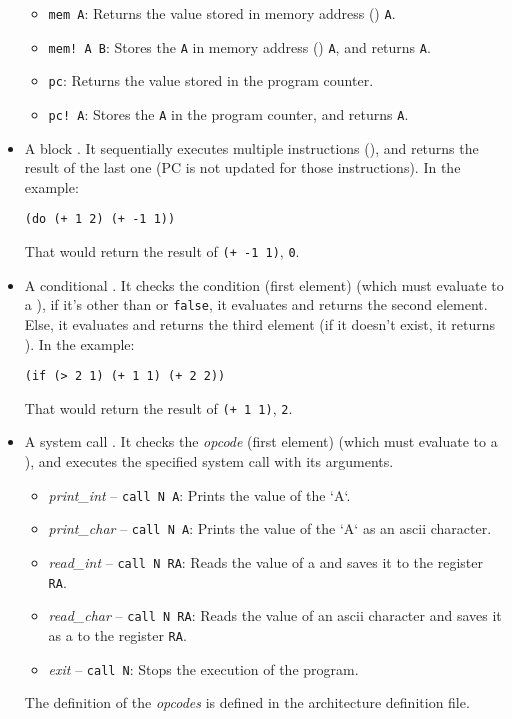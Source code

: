 \begin{itemize}
\begin{itemize}
    \item \texttt{mem A}: Returns the value stored in memory address () \texttt{A}.
    \item \texttt{mem!\ A B}: Stores the  \texttt{A} in memory address () \texttt{A}, and returns \texttt{A}.
    \item \texttt{pc}: Returns the value stored in the program counter.
    \item \texttt{pc!\ A}: Stores the  \texttt{A} in the program counter, and returns \texttt{A}.
  \end{itemize}
  \item A block . It sequentially executes multiple instructions (), and returns the result of the last one (PC is not updated for those instructions). In the example:
  \begin{lstlisting}
(do (+ 1 2) (+ -1 1))
  \end{lstlisting}
  That would return the result of \texttt{(+ -1 1)}, \texttt{0}.
  \item A conditional . It checks the condition (first element) (which must evaluate to a ), if it's other than  or \texttt{false}, it evaluates and returns the second element. Else, it evaluates and returns the third element (if it doesn't exist, it returns ). In the example:
  \begin{lstlisting}
(if (> 2 1) (+ 1 1) (+ 2 2))
  \end{lstlisting}
  That would return the result of \texttt{(+ 1 1)}, \texttt{2}.
  \item A system call . It checks the \textit{opcode} (first element) (which must evaluate to a ), and executes the specified system call with its arguments.
  \begin{itemize}
    \item \textit{print\_int} -- \texttt{call N A}: Prints the value of the  `A`.
    \item \textit{print\_char} -- \texttt{call N A}: Prints the value of the  `A` as an ascii character.
    \item \textit{read\_int} -- \texttt{call N RA}: Reads the value of a  and saves it to the register \texttt{RA}.
    \item \textit{read\_char} -- \texttt{call N RA}: Reads the value of an ascii character and saves it as a  to the register \texttt{RA}.
    \item \textit{exit} -- \texttt{call N}: Stops the execution of the program.
  \end{itemize}
  The definition of the \textit{opcodes} is defined in the architecture definition file.
\end{itemize}

